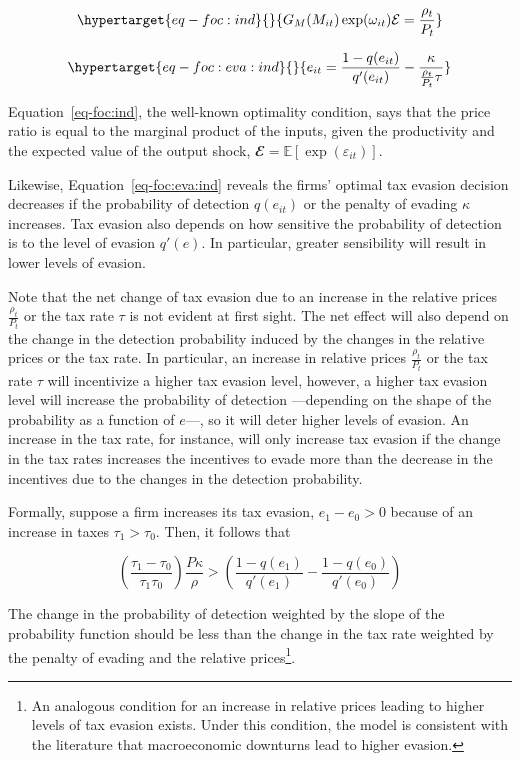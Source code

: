 \documentclass[
  12pt]{article}
\theoremstyle{definition}
\theoremstyle{remark}
\begin{document}
\begin{equation}\protect\hypertarget{eq-foc:ind}{}{
G_M(M_{it})\exp(\omega_{it})\mathcal{E}=\frac{\rho_{t}}{P_t}
}\label{eq-foc:ind}\end{equation}

\begin{equation}\protect\hypertarget{eq-foc:eva:ind}{}{
    e_{it}=\frac{1-q(e_{it})}{q'(e_{it})}-\frac{\kappa}{\frac{\rho_{t}}{P_t}\tau}
}\label{eq-foc:eva:ind}\end{equation}

Equation~\ref{eq-foc:ind}, the well-known optimality condition, says
that the price ratio is equal to the marginal product of the inputs,
given the productivity and the expected value of the output shock,
\(\mathbfcal{E}=\mathbb{E}[\exp(\varepsilon_{it})]\).

Likewise, Equation~\ref{eq-foc:eva:ind} reveals the firms' optimal tax
evasion decision decreases if the probability of detection \(q(e_{it})\)
or the penalty of evading \(\kappa\) increases. Tax evasion also depends
on how sensitive the probability of detection is to the level of evasion
\(q'(e)\). In particular, greater sensibility will result in lower
levels of evasion.

Note that the net change of tax evasion due to an increase in the
relative prices \(\frac{\rho_{t}}{P_t}\) or the tax rate \(\tau\) is not
evident at first sight. The net effect will also depend on the change in
the detection probability induced by the changes in the relative prices
or the tax rate. In particular, an increase in relative prices
\(\frac{\rho_{t}}{P_t}\) or the tax rate \(\tau\) will incentivize a
higher tax evasion level, however, a higher tax evasion level will
increase the probability of detection ---depending on the shape of the
probability as a function of \(e\)---, so it will deter higher levels of
evasion. An increase in the tax rate, for instance, will only increase
tax evasion if the change in the tax rates increases the incentives to
evade more than the decrease in the incentives due to the changes in the
detection probability.

Formally, suppose a firm increases its tax evasion, \(e_1-e_0>0\)
because of an increase in taxes \(\tau_1>\tau_0\). Then, it follows that

\[
\left(\frac{\tau_1-\tau_0}{\tau_1\tau_0}\right)\frac{P\kappa}{\rho}>
  \left(\frac{1-q(e_1)}{q'(e_1)}-\frac{1-q(e_0)}{q'(e_0)}\right)
\]

The change in the probability of detection weighted by the slope of the
probability function should be less than the change in the tax rate
weighted by the penalty of evading and the relative prices\footnote{An
  analogous condition for an increase in relative prices leading to
  higher levels of tax evasion exists. Under this condition, the model
  is consistent with the literature that macroeconomic downturns lead to
  higher evasion.}.
\end{document}
